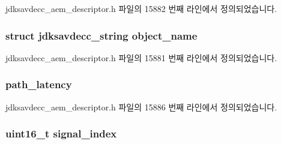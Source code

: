 jdksavdecc\+\_\+aem\+\_\+descriptor.\+h 파일의 15882 번째 라인에서 정의되었습니다.

\subsubsection[{\texorpdfstring{object\+\_\+name}{object_name}}]{\setlength{\rightskip}{0pt plus 5cm}struct {\bf jdksavdecc\+\_\+string} object\+\_\+name}\hypertarget{structjdksavdecc__descriptor__audio__cluster_a7d1f5945a13863b1762fc6db74fa8f80}{}\label{structjdksavdecc__descriptor__audio__cluster_a7d1f5945a13863b1762fc6db74fa8f80}


jdksavdecc\+\_\+aem\+\_\+descriptor.\+h 파일의 15881 번째 라인에서 정의되었습니다.

\subsubsection[{\texorpdfstring{path\+\_\+latency}{path_latency}}]{ path\+\_\+latency}\hypertarget{structjdksavdecc__descriptor__audio__cluster_a5527ea1fa3f885e9d2264e450e1635fa}{}\label{structjdksavdecc__descriptor__audio__cluster_a5527ea1fa3f885e9d2264e450e1635fa}


jdksavdecc\+\_\+aem\+\_\+descriptor.\+h 파일의 15886 번째 라인에서 정의되었습니다.

\subsubsection[{\texorpdfstring{signal\+\_\+index}{signal_index}}]{\setlength{\rightskip}{0pt plus 5cm}uint16\+\_\+t signal\+\_\+index}\hypertarget{structjdksavdecc__descriptor__audio__cluster_ae2e81a95ee9ad83f1fe22b6a1ee29075}{}\label{structjdksavdecc__descriptor__audio__cluster_ae2e81a95ee9ad83f1fe22b6a1ee29075}


